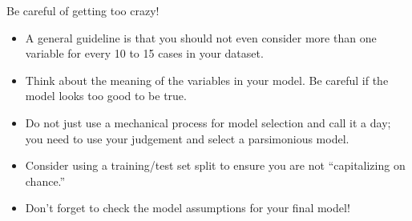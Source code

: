\documentclass{beamer}\usepackage[]{graphicx}\usepackage[]{color}
\makeatletter
\newcommand{\hlnum}[1]{\textcolor[rgb]{0.824,0.412,0.118}{#1}}%
\newcommand{\hlopt}[1]{\textcolor[rgb]{1,0.894,0.769}{#1}}%
\newcommand{\hlstd}[1]{\textcolor[rgb]{1,0.894,0.769}{#1}}%
\newcommand{\hlkwb}[1]{\textcolor[rgb]{0.804,0.776,0.451}{#1}}%
\newcommand{\hlkwd}[1]{\textcolor[rgb]{1,0.78,0.769}{#1}}%
\newenvironment{kframe}{%
 \def\at@end@of@kframe{}%
 \ifinner\ifhmode%
  \def\at@end@of@kframe{\end{minipage}}%
  \begin{minipage}{\columnwidth}%
 \fi\fi%
 \def\FrameCommand##1{\hskip\@totalleftmargin \hskip-\fboxsep
 \colorbox{shadecolor}{##1}\hskip-\fboxsep
     \hskip-\linewidth \hskip-\@totalleftmargin \hskip\columnwidth}%
 \MakeFramed {\advance\hsize-\width
   \@totalleftmargin\z@ \linewidth\hsize
   \@setminipage}}%
 {\par\unskip\endMakeFramed%
 \at@end@of@kframe}
\newenvironment{knitrout}{}{} %
\makeatother
\begin{document}
\begin{darkframes}

    \begin{frame}{Be careful of getting too crazy!}
      \begin{itemize}[<+->]
        \item A general guideline is that you should not even consider more than one variable for every 10 to 15 cases in your dataset.
        \item Think about the meaning of the variables in your model. Be careful if the model looks too good to be true.
        \item Do not just use a mechanical process for model selection and call it a day; you need to use your judgement and select a parsimonious model.
        \item Consider using a training/test set split to ensure you are not ``capitalizing on chance.''
        \item Don't forget to check the model assumptions for your final model!
      \end{itemize}
    \end{frame}

  \end{darkframes}
\end{document}
